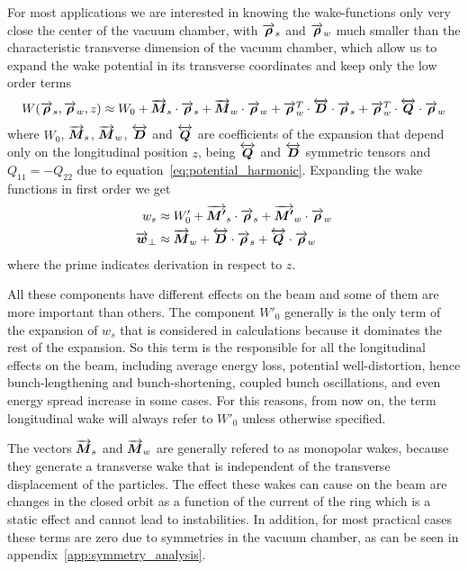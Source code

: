     For most applications we are interested in knowing the wake-functions only very close the center of the vacuum chamber, with $\overrightarrow{\boldsymbol{\rho}}_s$ and $\overrightarrow{\boldsymbol{\rho}}_w$ much smaller than the characteristic transverse dimension of the vacuum chamber, which allow us to expand the wake potential in its transverse coordinates and keep only the low order terms
    \begin{align}\label{eq:wake_potential_expansion}
      	W(\overrightarrow{\boldsymbol{\rho}}_s, \overrightarrow{\boldsymbol{\rho}}_w, z) \approx W_0 +
	  	\overrightarrow{\boldsymbol{M}}_s\cdot\overrightarrow{\boldsymbol{\rho}}_s + \overrightarrow{\boldsymbol{M}}_w\cdot\overrightarrow{\boldsymbol{\rho}}_w +
	  	\overrightarrow{\boldsymbol{\rho}}_w^T\cdot\overleftrightarrow{\boldsymbol{D}}\cdot\overrightarrow{\boldsymbol{\rho}}_s +
	  	\overrightarrow{\boldsymbol{\rho}}_w^T\cdot\overleftrightarrow{\boldsymbol{Q}}\cdot\overrightarrow{\boldsymbol{\rho}}_w
    \end{align}
    where $W_0$, $\overrightarrow{\boldsymbol{M}}_s$, $\overrightarrow{\boldsymbol{M}}_w$, $\overleftrightarrow{\boldsymbol{D}}$ and $\overleftrightarrow{\boldsymbol{Q}}$ are coefficients of the expansion that depend only on the longitudinal position $z$, being $\overleftrightarrow{\boldsymbol{Q}}$ and $\overleftrightarrow{\boldsymbol{D}}$ symmetric tensors and $Q_{11}=-Q_{22}$ due to equation~\eqref{eq:potential_harmonic}. Expanding the wake functions in first order we get
    \begin{align}\label{eq:wake_functions_expansion}
      	w_s &\approx W'_0 + \overrightarrow{\boldsymbol{M'}}_s\cdot\overrightarrow{\boldsymbol{\rho}}_s + \overrightarrow{\boldsymbol{M'}}_w\cdot\overrightarrow{\boldsymbol{\rho}}_w \\
	  	\overrightarrow{\boldsymbol{w}}_\perp &\approx \overrightarrow{\boldsymbol{M}}_w + \overleftrightarrow{\boldsymbol{D}}\cdot\overrightarrow{\boldsymbol{\rho}}_s + \overleftrightarrow{\boldsymbol{Q}}\cdot\overrightarrow{\boldsymbol{\rho}}_w
    \end{align}
    where the prime indicates derivation in respect to $z$.

    All these components have different effects on the beam and some of them are more important than others. The component $W'_0$ generally is the only term of the expansion of $w_s$ that is considered in calculations because it dominates the rest of the expansion. So this term is the responsible for all the longitudinal effects on the beam, including average energy loss, potential well-distortion, hence bunch-lengthening and bunch-shortening, coupled bunch oscillations, and even energy spread increase in some cases. For this reasons, from now on, the term longitudinal wake will always refer to $W'_0$ unless otherwise specified.

    The vectors $\overrightarrow{\boldsymbol{M}}_s$ and $\overrightarrow{\boldsymbol{M}}_w$ are generally refered to as monopolar wakes, because they generate a transverse wake that is independent of the transverse displacement of the particles. The effect these wakes can cause on the beam are changes in the closed orbit as a function of the current of the ring which is a static effect and cannot lead to instabilities. In addition, for most practical cases these terms are zero due to symmetries in the vacuum chamber, as can be seen in appendix~\ref{app:symmetry_analysis}.

